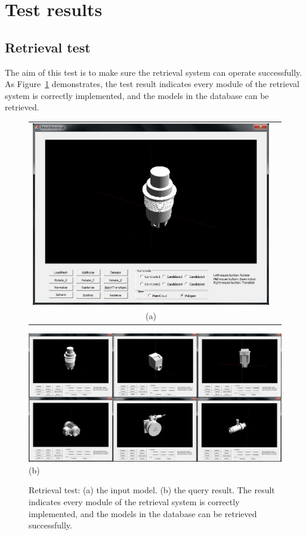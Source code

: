 \section{Test results} \label{sec:results}

\subsection{Retrieval test} 

The aim of this test is to make sure the retrieval system can operate successfully. As Figure~\ref{retrievaltest_UI} demonstrates, the test result indicates every module of the retrieval system is correctly implemented, and the models in the database can be retrieved. 

\begin{figure}
\begin{center}
\begin{tabular}{cc}   %
   \includegraphics[width=0.6\linewidth]{input_initialdesign}  \\
   (a)\\
\end{tabular}
   \includegraphics[width=1\linewidth]{output_finaldesign}  \\
   (b)\\
\caption{Retrieval test: (a) the input model. (b) the query result. The result indicates every module of the retrieval system is correctly implemented, and the models in the database can be retrieved successfully.} 
  \label{retrievaltest_UI}
\end{center}
\end{figure}

